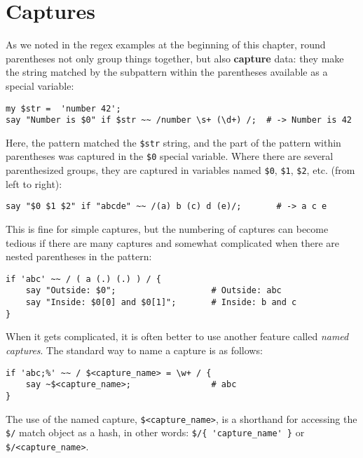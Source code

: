 \section{Captures}

As we noted in the regex examples at the beginning of this 
chapter, round parentheses not only group things together, 
but also {\bf capture} data: they make the string matched 
by the subpattern within the parentheses available as a 
special variable:

\begin{verbatim}
my $str =  'number 42';
say "Number is $0" if $str ~~ /number \s+ (\d+) /;  # -> Number is 42
\end{verbatim}
%

Here, the pattern matched the \verb'$str' string, and the 
part of the pattern within parentheses was captured in 
the \verb'$0' special variable. Where there are several 
parenthesized groups, they are captured in variables 
named \verb'$0', \verb'$1',  \verb'$2', etc. (from 
left to right):

\begin{verbatim}
say "$0 $1 $2" if "abcde" ~~ /(a) b (c) d (e)/;       # -> a c e
\end{verbatim}
%

This is fine for simple captures, but the numbering of 
captures can become tedious if there are many captures and 
somewhat complicated when there are nested parentheses in 
the pattern:

\begin{verbatim}
if 'abc' ~~ / ( a (.) (.) ) / {
    say "Outside: $0";                   # Outside: abc
    say "Inside: $0[0] and $0[1]";       # Inside: b and c
}
\end{verbatim}

When it gets complicated, it is often better to use another 
feature called \emph{named captures}. The standard way to 
name a capture is as follows:

\begin{verbatim}
if 'abc;%' ~~ / $<capture_name> = \w+ / {
    say ~$<capture_name>;                # abc
}
\end{verbatim} 

The use of the named capture, \verb'$<capture_name>', 
is a shorthand for accessing the \verb'$/' match object as 
a hash, in other words: \verb"$/{ 'capture_name' }" or 
\verb'$/<capture_name>'.

